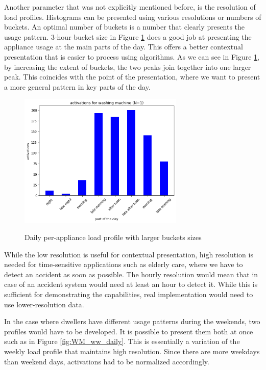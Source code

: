 Another parameter that was not explicitly mentioned before, is the resolution of load profiles. 
Histograms can be presented using various resolutions or numbers of buckets.
An optimal number of buckets is a number that clearly presents the usage pattern. 
3-hour bucket size in Figure \ref{fig:4hours} does a good job at presenting the appliance usage at the main parts of the day.
This offers a better contextual presentation that is easier to process using algorithms.
As we can see in Figure \ref{fig:4hours}, by increasing the extent of buckets, the two peaks join together into one larger peak.
This coincides with the point of the presentation, where we want to present a more general pattern in key parts of the day.

\begin{figure}[H]
	\centering
	\caption{Daily per-appliance load profile with larger buckets sizes}
	\includegraphics[width=0.7\textwidth]{../Figures/LPS/3_hours.png}
	\label{fig:4hours}
\end{figure}

While the low resolution is useful for contextual presentation,
high resolution is needed for time-sensitive applications such as elderly care,
where we have to detect an accident as soon as possible.
The hourly resolution would mean that in case of an accident system would need at least an hour to detect it.
While this is sufficient for demonstrating the capabilities, real implementation would need to use lower-resolution data.

In the case where dwellers have different usage patterns during the weekends, two profiles would have to be developed.
It is possible to present them both at once such as in Figure \ref{fig:WM_ww_daily}. 
This is essentially a variation of the weekly load profile that maintains high resolution.
Since there are more weekdays than weekend days, activations had to be normalized accordingly.

